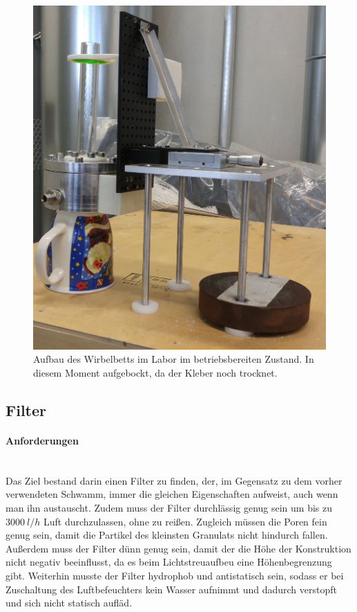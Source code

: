 \begin{figure}[h!]
	\begin{center}
		\includegraphics[scale=0.13]{Laboraufbau.jpg}
		\caption[Laboraufbau Wirbelbett]{Aufbau des Wirbelbetts im Labor im betriebsbereiten Zustand. In diesem Moment aufgebockt, da der Kleber noch trocknet.}
	\end{center}
\end{figure}


\newpage

\subsection{Filter}

\paragraph{Anforderungen}
\hfill \\
Das Ziel bestand darin einen Filter zu finden, der, im Gegensatz zu dem vorher verwendeten Schwamm, immer die gleichen Eigenschaften aufweist, auch wenn man ihn austauscht. Zudem muss der Filter durchlässig genug sein um bis zu $\SI{3000}{l/h}$ Luft durchzulassen, ohne zu reißen. Zugleich müssen die Poren fein genug sein, damit die Partikel des kleinsten Granulats nicht hindurch fallen. Außerdem muss der Filter dünn genug sein, damit der die Höhe der Konstruktion nicht negativ beeinflusst, da es beim Lichtstreuaufbeu eine Höhenbegrenzung gibt. Weiterhin musste der Filter hydrophob und antistatisch sein, sodass er bei Zuschaltung des Luftbefeuchters kein Wasser aufnimmt und dadurch verstopft und sich nicht statisch aufläd.


